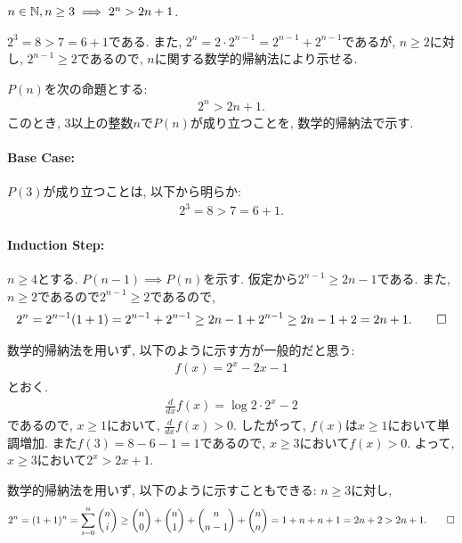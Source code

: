 \begin{prop}
  \label{p:20230813}
  $n\in\mathbb{N}, n\geq 3\implies 2^n> 2n+1$.
\end{prop}
\begin{proof**}
  $2^3=8>7=6+1$である.
  また,
  $2^n=2\cdot 2^{n-1}=2^{n-1}+2^{n-1}$であるが,
  $n\geq 2$に対し,
  $2^{n-1} \geq 2$であるので,
  $n$に関する数学的帰納法により示せる.
\end{proof**}
\begin{proof*}
  $P(n)$を次の命題とする:
  \begin{align*}
    2^n> 2n+1
    .
  \end{align*}
  このとき,
  $3$以上の整数$n$で$P(n)$が成り立つことを,
  数学的帰納法で示す.

  \paragraph{Base Case:}
  $P(3)$が成り立つことは, 以下から明らか:
  \begin{align*}
    2^3=8>7=6+1.
  \end{align*}
  \paragraph{Induction Step:}
  $n\geq 4$とする.
  $P(n-1)\implies P(n)$を示す.
  仮定から$2^{n-1}\geq 2n-1$である.
  また, $n\geq 2$であるので$2^{n-1}\geq 2$であるので,
  \begin{align*}
    2^n=2^{n-1}(1+1)=2^{n-1}+2^{n-1}\geq 2n-1+2^{n-1}\geq 2n-1+2=2n+1
    .\qedhere
  \end{align*}
\end{proof*}

\begin{rem}
  数学的帰納法を用いず, 以下のように示す方が一般的だと思う:
  \begin{align*}
    f(x)=2^x-2x-1
  \end{align*}
  とおく.
  \begin{align*}
    \frac{d}{dx}f(x)=\log 2 \cdot 2^x-2
  \end{align*}
  であるので, $x\geq 1$において, $\frac{d}{dx}f(x)> 0$.
  したがって, $f(x)$は$x\geq 1$において単調増加.
  また$f(3)=8-6-1=1$であるので,
  $x\geq 3$において$f(x) > 0$.
  よって, $x\geq 3$において$2^x>2x+1$.
\end{rem}

\begin{rem}
  数学的帰納法を用いず, 以下のように示すこともできる:
  $n\geq 3$に対し, 
  \begin{align*}
    2^n=(1+1)^n=\sum_{i=0}^n \binom{n}{i}\geq \binom{n}{0}+\binom{n}{1}+\binom{n}{n-1}+\binom{n}{n}=1+n+n+1=2n+2> 2n+1
    .\qedhere
  \end{align*}
\end{rem}

